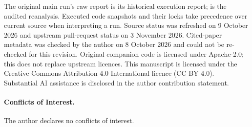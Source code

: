 \documentclass[11pt,a4paper]{article}
\begin{document}
The original main run's raw report is its historical execution report;  is the audited reanalysis. Executed code snapshots and their locks take precedence over current source when interpreting a run. Source status was refreshed on 9 October 2026 and upstream pull-request status on 3 November 2026. Cited-paper metadata was checked by the author on 8 October 2026 and could not be re-checked for this revision. Original companion code is licensed under Apache-2.0; this does not replace upstream licences. This manuscript is licensed under the Creative Commons Attribution 4.0 International licence (CC BY 4.0). Substantial AI assistance is disclosed in the author contribution statement.

\paragraph{Conflicts of Interest.} The author declares no conflicts of interest.
\end{document}
